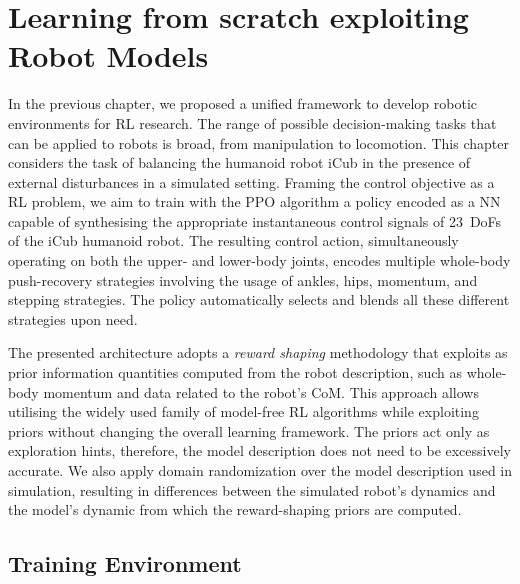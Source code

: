 \acresetall
\chapter{Learning from scratch exploiting Robot Models}
\label{ch:learning_from_scratch}

In the previous chapter, we proposed a unified framework to develop robotic environments for \ac{RL} research.
The range of possible decision-making tasks that can be applied to robots is broad, from manipulation to locomotion.
This chapter considers the task of balancing the humanoid robot iCub in the presence of external disturbances in a simulated setting.
Framing the control objective as a \ac{RL} problem, we aim to train with the \ac{PPO} algorithm a policy encoded as a \ac{NN} capable of synthesising the appropriate instantaneous control signals of 23~\acp{DoF} of the iCub humanoid robot.
The resulting control action, simultaneously operating on both the upper- and lower-body joints, encodes multiple whole-body push-recovery strategies involving the usage of ankles, hips, momentum, and stepping strategies.
The policy automatically selects and blends all these different strategies upon need.


The presented architecture adopts a \emph{reward shaping} methodology that exploits as prior information quantities computed from the robot description, such as whole-body momentum and data related to the robot's \ac{CoM}.
This approach allows utilising the widely used family of model-free \ac{RL} algorithms while exploiting priors without changing the overall learning framework.
The priors act only as exploration hints, therefore, the model description does not need to be excessively accurate.
We also apply domain randomization over the model description used in simulation, resulting in differences between the simulated robot's dynamics and the model's dynamic from which the reward-shaping priors are computed.

\section{Training Environment}

